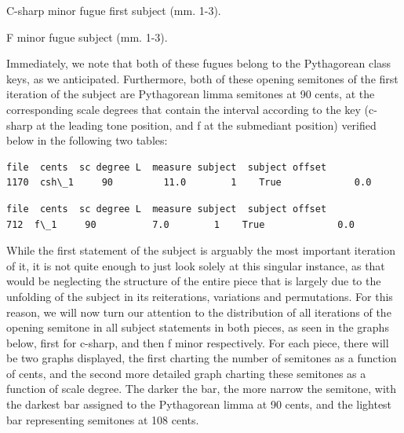 \begin{Example}[H]
    \begin{center}
    \caption{ C-sharp minor fugue first subject (mm. 1-3). }
    \end{center}
\end{Example}
    


\begin{Example}[H]
    \begin{center}
    \caption{ F minor fugue subject (mm. 1-3). }
    \end{center}
\end{Example}
    
    Immediately, we note that both of these fugues belong to the Pythagorean
class keys, as we anticipated. Furthermore, both of these opening
semitones of the first iteration of the subject are Pythagorean limma
semitones at 90 cents, at the corresponding scale degrees that contain
the interval according to the key (c-sharp at the leading tone position,
and f at the submediant position) verified below in the following two
tables:

\begin{Verbatim}[commandchars=\\\{\}]
       file  cents  sc degree L  measure subject  subject offset
1170  csh\_1     90         11.0        1    True             0.0
\end{Verbatim}
\begin{Verbatim}[commandchars=\\\{\}]
    file  cents  sc degree L  measure subject  subject offset
712  f\_1     90          7.0        1    True             0.0
\end{Verbatim}
    While the first statement of the subject is arguably the most important
iteration of it, it is not quite enough to just look solely at this
singular instance, as that would be neglecting the structure of the
entire piece that is largely due to the unfolding of the subject in its
reiterations, variations and permutations. For this reason, we will now
turn our attention to the distribution of all iterations of the opening
semitone in all subject statements in both pieces, as seen in the graphs
below, first for c-sharp, and then f minor respectively. For each piece,
there will be two graphs displayed, the first charting the number of
semitones as a function of cents, and the second more detailed graph
charting these semitones as a function of scale degree. The darker the
bar, the more narrow the semitone, with the darkest bar assigned to the
Pythagorean limma at 90 cents, and the lightest bar representing
semitones at 108 cents.


